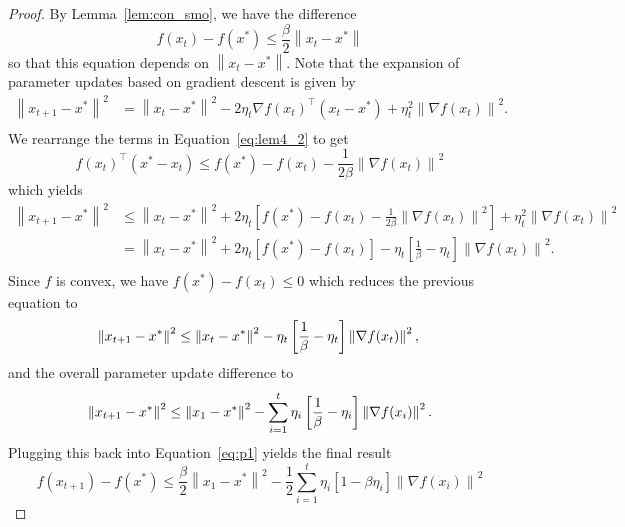 \documentclass{article}
\newcommand{\norm}[1]{\left\| #1 \right\| }
\theoremstyle{definition}
\begin{document}
\begin{proof}
    By Lemma~\ref{lem:con_smo}, we have the difference 
    \begin{equation}
        \label{eq:p1}
        f(x_t) - f(x^*) \leq \frac{\beta}{2}\norm{x_t - x^*}
    \end{equation}
    so that this equation depends on $\norm{x_t - x^*}$. 
    Note that the expansion of parameter updates based on gradient descent is
    given by
    \begin{equation}
        \begin{aligned}
            \norm{x_{t + 1} - x^*}^2 &= \norm{x_t - x^*}^2 - 2\eta_t {\nabla
            f(x_t)}^\intercal (x_t - x^*) + \eta_t^2 \norm{\nabla f(x_t)}^2. \\
        \end{aligned}
    \end{equation}
    We rearrange the terms in Equation~\ref{eq:lem4_2} to get 
    \begin{equation}
        {f(x_t)}^\intercal (x^* - x_t) \leq f(x^*) - f(x_t) -
        \frac{1}{2\beta}\norm{\nabla f(x_t)}^2
    \end{equation}
    which yields
    \begin{equation}
        \begin{aligned}
            \norm{x_{t + 1} - x^*}^2 &\leq \norm{x_t - x^*}^2 + 2\eta_t \left[ f(x^*) - f(x_t) - \frac{1}{2\beta}\norm{\nabla f(x_t)}^2\right] + \eta_t^2 \norm{\nabla f(x_t)}^2 \\
            &= \norm{x_t - x^*}^2 + 2\eta_t \left[ f(x^*) - f(x_t)\right] -
            \eta_t\left[\frac{1}{\beta} - \eta_t\right] \norm{\nabla f(x_t)}^2. \\
        \end{aligned}
    \end{equation}
    Since $f$ is convex, we have $f(x^*) - f(x_t) \leq 0$ which reduces the
    previous equation to 
    \begin{equation}
            \norm{x_{t + 1} - x^*}^2 \leq  \norm{x_t - x^*}^2  -
            \eta_t\left[\frac{1}{\beta} - \eta_t\right] \norm{\nabla f(x_t)}^2, \\
    \end{equation}
    and the overall parameter update difference to
    \begin{equation}
        \norm{x_{t + 1} - x^*}^2 \leq  \norm{x_1 - x^*}^2 - \sum_{i = 1}^t  \eta_i\left[\frac{1}{\beta} - \eta_i\right] \norm{\nabla f(x_i)}^2. \\
    \end{equation}
    Plugging this back into Equation~\ref{eq:p1} yields the final result
    \begin{equation}
        f(x_{t+1}) - f(x^*) \leq \frac{\beta}{2}\norm{x_1 - x^*}^2 - \frac 1 2\sum_{i =
        1}^{t}  \eta_i\left[1 - \beta\eta_i\right] \norm{\nabla f(x_i)}^2
    \end{equation}
\end{proof}
\end{document}
